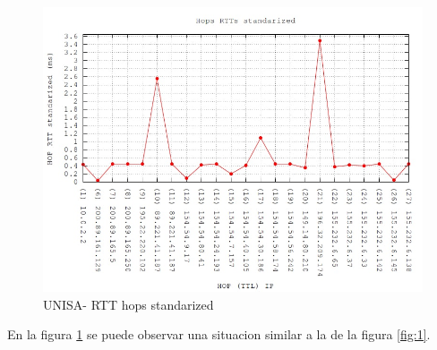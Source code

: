 \begin{figure}[!htbp]
  \centering
    \includegraphics[scale=0.6]{imagenes/unisa-graficos/traceroute-unisa-standarized.jpg}
  \caption{UNISA- RTT hops standarized}
  \label{fig:2}
\end{figure}

En la figura \ref{fig:2} se puede observar una situacion similar a la de la figura \ref{fig:1}.

